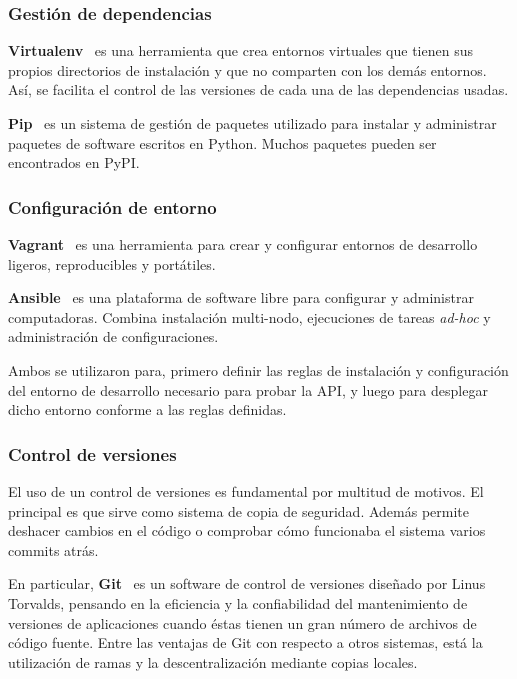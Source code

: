 \subsubsection{Gestión de dependencias}
\label{subsec:gestion-dependencias}

\textbf{Virtualenv}~\cite{virtualenv} es una herramienta que crea entornos
virtuales que tienen sus propios directorios de instalación y que no comparten
con los demás entornos. Así, se facilita el control de las versiones de cada una
de las dependencias usadas.

\textbf{Pip}~\cite{pip} es un sistema de gestión de paquetes utilizado para
instalar y administrar paquetes de software escritos en Python. Muchos paquetes
pueden ser encontrados en PyPI.


\subsubsection{Configuración de entorno}

\textbf{Vagrant}~\cite{vagrant} es una herramienta para crear y configurar
entornos de desarrollo ligeros, reproducibles y portátiles.

\textbf{Ansible}~\cite{ansible} es una plataforma de software libre para
configurar y administrar computadoras. Combina instalación multi-nodo,
ejecuciones de tareas \textit{ad-hoc} y administración de configuraciones.

Ambos se utilizaron para, primero definir las reglas de instalación y
configuración del entorno de desarrollo necesario para probar la API, y luego
para desplegar dicho entorno conforme a las reglas definidas.


\subsubsection{Control de versiones}

El uso de un control de versiones es fundamental por multitud de motivos. El
principal es que sirve como sistema de copia de seguridad. Además permite
deshacer cambios en el código o comprobar cómo funcionaba el sistema varios
commits atrás.

En particular, \textbf{Git}~\cite{git} es un software de control de versiones
diseñado por Linus Torvalds, pensando en la eficiencia y la confiabilidad del
mantenimiento de versiones de aplicaciones cuando éstas tienen un gran número de
archivos de código fuente. Entre las ventajas de Git con respecto a otros
sistemas, está la utilización de ramas y la descentralización mediante copias
locales.

